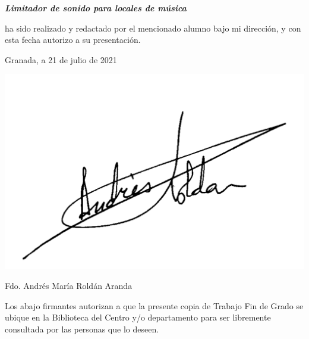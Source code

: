 \begin{doublespace}
\begin{center}
\textbf{\emph{\large {}Limitador de sonido para locales de música}}
\par\end{center}{\large \par}
\end{doublespace}

\noindent ha sido realizado y redactado por el mencionado alumno bajo
mi dirección, y con esta fecha autorizo a su presentación.

\vspace*{1cm}

\begin{center}
Granada, a 21 de julio de 2021
\par\end{center}

\bigskip
\bigskip
\begin{center}
\includegraphics[scale=0.2]{imagenes/firmaTutor.png}
\end{center}

\begin{center}
\begin{doublespace}
Fdo. Andrés María Roldán Aranda
\end{doublespace}
\end{center}

\newpage
\thispagestyle{empty}
\noindent

\newpage
{}
\noindent
\blankpage

\bigskip

\noindent Los abajo firmantes autorizan a que la presente copia de
Trabajo Fin de Grado se ubique en la Biblioteca del Centro y/o
departamento para ser libremente consultada por las personas que lo
deseen.

